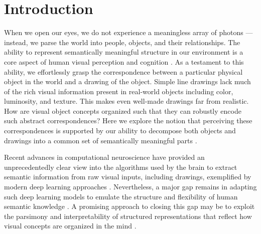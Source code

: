 \documentclass[10pt,letterpaper]{article}
\begin{document}
\section{Introduction}


When we open our eyes, we do not experience a meaningless array of photons --- instead, we parse the world into people, objects, and their relationships. 
The ability to represent semantically meaningful structure in our environment is a core aspect of human visual perception and cognition \cite{navon1977forest}. 
As a testament to this ability, we effortlessly grasp the correspondence between a particular physical object in the world and a drawing of the object.
Simple line drawings lack much of the rich visual information present in real-world objects including color, luminosity, and texture. This makes even well-made drawings far from realistic. 
How are visual object concepts organized such that they can robustly encode such abstract correspondences?
Here we explore the notion that perceiving these correspondences is supported by our ability to decompose both objects and drawings into a common set of semantically meaningful parts \cite{biederman1988surface}. 

Recent advances in computational neuroscience have provided an unprecedentedly clear view into the algorithms used by the brain to extract semantic information from raw visual inputs, including drawings, exemplified by modern deep learning approaches \cite{FanCommon2018,yamins2014performance}.
Nevertheless, a major gap remains in adapting such deep learning models to emulate the structure and flexibility of human semantic knowledge \cite{lake2017building}.
A promising approach to closing this gap may be to exploit the parsimony and interpretability of structured representations that reflect how visual concepts are organized in the mind \cite{battaglia2018relational}.
\end{document}
